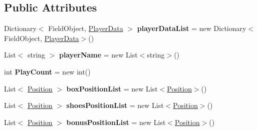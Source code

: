 \subsection*{Public Attributes}
\begin{DoxyCompactItemize}
\item 
Dictionary$<$ Field\+Object, \hyperlink{classhoppin_1_1_game_system_1_1_player_data}{Player\+Data} $>$ {\bfseries player\+Data\+List} = new Dictionary$<$Field\+Object, \hyperlink{classhoppin_1_1_game_system_1_1_player_data}{Player\+Data}$>$()\hypertarget{classhoppin_1_1_game_system_1_1_game_state_a770b9eac31b09a8b05306cbfa31480c7}{}\label{classhoppin_1_1_game_system_1_1_game_state_a770b9eac31b09a8b05306cbfa31480c7}

\item 
List$<$ string $>$ {\bfseries player\+Name} = new List$<$string$>$()\hypertarget{classhoppin_1_1_game_system_1_1_game_state_a3b397e26c99ffb7dc8983277c1020c53}{}\label{classhoppin_1_1_game_system_1_1_game_state_a3b397e26c99ffb7dc8983277c1020c53}

\item 
int {\bfseries Play\+Count} = new int()\hypertarget{classhoppin_1_1_game_system_1_1_game_state_a73a4b19854ff38c7961c21df924de563}{}\label{classhoppin_1_1_game_system_1_1_game_state_a73a4b19854ff38c7961c21df924de563}

\item 
List$<$ \hyperlink{classhoppin_1_1_game_system_1_1_position}{Position} $>$ {\bfseries box\+Position\+List} = new List$<$\hyperlink{classhoppin_1_1_game_system_1_1_position}{Position}$>$()\hypertarget{classhoppin_1_1_game_system_1_1_game_state_aeede9b8f24c849cc4a979ba5e3f1dbb6}{}\label{classhoppin_1_1_game_system_1_1_game_state_aeede9b8f24c849cc4a979ba5e3f1dbb6}

\item 
List$<$ \hyperlink{classhoppin_1_1_game_system_1_1_position}{Position} $>$ {\bfseries shoes\+Position\+List} = new List$<$\hyperlink{classhoppin_1_1_game_system_1_1_position}{Position}$>$()\hypertarget{classhoppin_1_1_game_system_1_1_game_state_aafbf8d917ae66259ead1c2519a757cff}{}\label{classhoppin_1_1_game_system_1_1_game_state_aafbf8d917ae66259ead1c2519a757cff}

\item 
List$<$ \hyperlink{classhoppin_1_1_game_system_1_1_position}{Position} $>$ {\bfseries bonus\+Position\+List} = new List$<$\hyperlink{classhoppin_1_1_game_system_1_1_position}{Position}$>$()\hypertarget{classhoppin_1_1_game_system_1_1_game_state_ade3862019acf3fa56dc394455b087226}{}\label{classhoppin_1_1_game_system_1_1_game_state_ade3862019acf3fa56dc394455b087226}

\end{DoxyCompactItemize}
